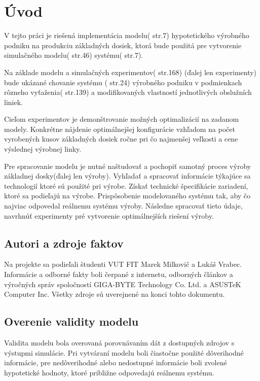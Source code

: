 \documentclass[12pt,a4paper,titlepage,final]{article}
\begin{document}
\newpage
\pagestyle{plain}
\setcounter{page}{1}

\section{Úvod}
V tejto práci je riešená implementácia modelu(\cite{peringer-slidy} str.7) hypotetického
výrobného podniku na produkciu základných dosiek, ktorá bude použitá pre 
vytvorenie simulačného modelu(\cite{peringer-slidy} str.46) systému(\cite{peringer-slidy} str.7).

Na základe modelu a simulačných experimentov(\cite{peringer-slidy} str.168)
(ďalej len experimenty) bude ukázané chovanie systému (\cite{peringer-slidy} str.24)
výrobného podniku v podmienkach rôzneho vyťaženia(\cite{peringer-slidy} str.139) a
modifikovaných vlastností jednotlivých obslužních liniek.
 

Cieľom experimentov je demonštrovanie možných optimalizácií na zadanom modely. Kon\-kré\-tne
nájdenie optimálnejšej konfigurácie vzhľadom na počet vyrobených
kusov základných dosiek ročne pri čo najmenšej veľkosti a cene výslednej 
výrobnej linky.

Pre spracovanie modelu je nutné naštudovať a pochopiť samotný proces výroby
základnej dosky(ďalej len výroby). Vyhľadať a spracovať informácie týkajúce sa 
technologií ktoré sú použité pri výrobe. Získať technické špecifikácie zariadení,
ktoré sa podieľajú na výrobe. Pri\-spô\-so\-be\-nie modelovaného systému tak,
aby čo najviac odpovedal reálnemu
systému výroby. Následne spracovať tieto údaje, navrhnúť experimenty pré 
vytvorenie optimálnejších riešení výroby. 

\subsection{Autori a zdroje faktov}
Na projekte sa podieľali študenti VUT FIT Marek Milkovič a Lukáš Vrabec. Informácie
a odborné fakty boli čerpané z internetu, odborných článkov a výročných
správ spoločností GIGA-BYTE Technology Co. Ltd. a ASUSTeK Computer Inc.
Všetky zdroje sú uverejnené na konci tohto dokumentu.

\subsection{Overenie validity modelu}
Validita modelu bola overovaná porovnávaním dát z dostupných zdrojov s výstupmi
simulácie. Pri vytváraní modelu boli čiastočne použité dôverihodné informácie,
pre nedôverihodné alebo nedostupné informácie boli zvolené hypotetické hodnoty,
ktoré približne odpovedajú reálnemu systému. 
\end{document}
